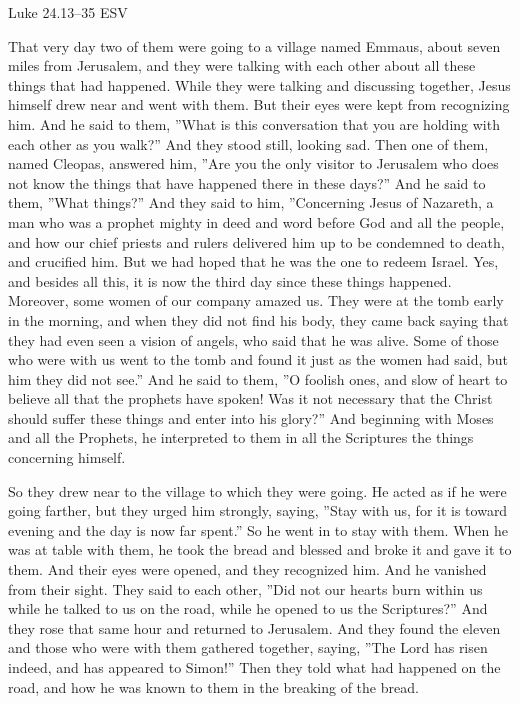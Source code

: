 \documentclass[
]{article}
\newcommand{\RL}[1]{\beginR #1\endR}
\begin{document}
Luke 24.13--35 ESV

That very day two of them were going to a village named Emmaus, about
seven miles from Jerusalem, and they were talking with each other about
all these things that had happened. While they were talking and
discussing together, Jesus himself drew near and went with them. But
their eyes were kept from recognizing him. And he said to them,
\RL{''}What is this conversation that you are holding with each other as
you walk?'' And they stood still, looking sad. Then one of them, named
Cleopas, answered him, \RL{''}Are you the only visitor to Jerusalem who
does not know the things that have happened there in these days?'' And
he said to them, \RL{''}What things?'' And they said to him,
\RL{''}Concerning Jesus of Nazareth, a man who was a prophet mighty in
deed and word before God and all the people, and how our chief priests
and rulers delivered him up to be condemned to death, and crucified him.
But we had hoped that he was the one to redeem Israel. Yes, and besides
all this, it is now the third day since these things happened. Moreover,
some women of our company amazed us. They were at the tomb early in the
morning, and when they did not find his body, they came back saying that
they had even seen a vision of angels, who said that he was alive. Some
of those who were with us went to the tomb and found it just as the
women had said, but him they did not see.'' And he said to them,
\RL{''}O foolish ones, and slow of heart to believe all that the
prophets have spoken! Was it not necessary that the Christ should suffer
these things and enter into his glory?'' And beginning with Moses and
all the Prophets, he interpreted to them in all the Scriptures the
things concerning himself.

So they drew near to the village to which they were going. He acted as
if he were going farther, but they urged him strongly, saying,
\RL{''}Stay with us, for it is toward evening and the day is now far
spent.'' So he went in to stay with them. When he was at table with
them, he took the bread and blessed and broke it and gave it to them.
And their eyes were opened, and they recognized him. And he vanished
from their sight. They said to each other, \RL{''}Did not our hearts
burn within us while he talked to us on the road, while he opened to us
the Scriptures?'' And they rose that same hour and returned to
Jerusalem. And they found the eleven and those who were with them
gathered together, saying, \RL{''}The Lord has risen indeed, and has
appeared to Simon!'' Then they told what had happened on the road, and
how he was known to them in the breaking of the bread.
\end{document}
